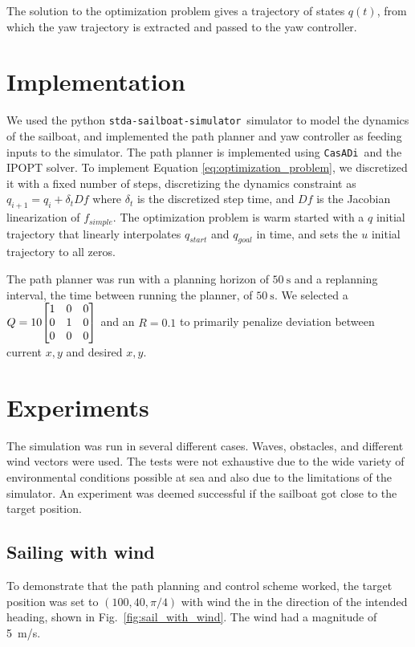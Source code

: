 \documentclass[conference]{IEEEtran}
\newcommand{\Sim}{\lstinline{stda-sailboat-simulator}\ }
\newcommand{\Casadi}{\lstinline{CasADi}\ }
\begin{document}
The solution to the optimization problem gives a trajectory of states \(q(t)\), from which the yaw trajectory is extracted and passed to the yaw controller.

\section{Implementation}

We used the python \Sim simulator to model the dynamics of the sailboat, and implemented the path planner and yaw controller as feeding inputs to the simulator. The path planner is implemented using \Casadi and the IPOPT solver. To implement Equation \ref{eq:optimization_problem}, we discretized it with a fixed number of steps, discretizing the dynamics constraint as \(q_{i+1} = q_i + \delta_t Df\) where \(\delta_t\) is the discretized step time, and \(Df\) is the Jacobian linearization of \(f_{simple}\). The optimization problem is warm started with a \(q\) initial trajectory that linearly interpolates \(q_{start}\) and \(q_{goal}\) in time, and sets the \(u\) initial trajectory to all zeros.

The path planner was run with a planning horizon of \(\SI{50}{\second}\) and a replanning interval, the time between running the planner, of \(\SI{50}{\second}\). We selected a \(Q = 10\mqty[1 & 0 & 0 \\ 0 & 1 & 0 \\ 0 & 0 & 0]\) and an 
\(R = 0.1\) to primarily penalize deviation between current \(x, y\) and desired \(x, y\).

\section{Experiments}
The simulation was run in several different cases. Waves, obstacles, and different wind vectors were used. The tests were not exhaustive due to the wide variety of environmental conditions possible at sea and also due to the limitations of the simulator. An experiment was deemed successful if the sailboat got close to the target position.

\subsection{Sailing with wind}
To demonstrate that the path planning  and control scheme worked, the target position was set to \((100, 40, \pi/4)\) with wind the in the direction of the intended heading, shown in Fig.~\ref{fig:sail_with_wind}. The wind had a magnitude of \SI{5}{\meter/\second}. 
\end{document}
